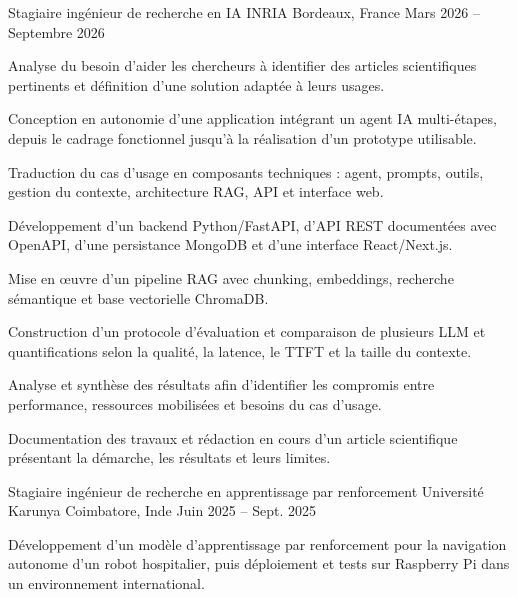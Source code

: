 
\begin{cventries}
  \cventry
    {Stagiaire ingénieur de recherche en IA}
    {INRIA}
    {Bordeaux, France}
    {Mars 2026 -- Septembre 2026}
    {
      \begin{cvitems}
        \item {Analyse du besoin d’aider les chercheurs à identifier des articles scientifiques pertinents et définition d’une solution adaptée à leurs usages.}
        \item {Conception en autonomie d’une application intégrant un agent IA multi-étapes, depuis le cadrage fonctionnel jusqu’à la réalisation d’un prototype utilisable.}
        \item {Traduction du cas d’usage en composants techniques : agent, prompts, outils, gestion du contexte, architecture RAG, API et interface web.}
        \item {Développement d’un backend Python/FastAPI, d’API REST documentées avec OpenAPI, d’une persistance MongoDB et d’une interface React/Next.js.}
        \item {Mise en œuvre d’un pipeline RAG avec chunking, embeddings, recherche sémantique et base vectorielle ChromaDB.}
        \item {Construction d’un protocole d’évaluation et comparaison de plusieurs LLM et quantifications selon la qualité, la latence, le TTFT et la taille du contexte.}
        \item {Analyse et synthèse des résultats afin d’identifier les compromis entre performance, ressources mobilisées et besoins du cas d’usage.}
        \item {Documentation des travaux et rédaction en cours d’un article scientifique présentant la démarche, les résultats et leurs limites.}
      \end{cvitems}
    }

  \cventry
    {Stagiaire ingénieur de recherche en apprentissage par renforcement}
    {Université Karunya}
    {Coimbatore, Inde}
    {Juin 2025 -- Sept. 2025}
    {
      \begin{cvitems}
        \item {Développement d’un modèle d’apprentissage par renforcement pour la navigation autonome d’un robot hospitalier, puis déploiement et tests sur Raspberry Pi dans un environnement international.}
      \end{cvitems}
    }
\end{cventries}
